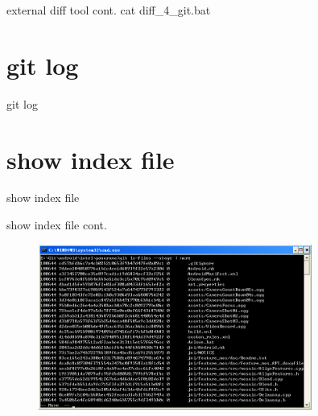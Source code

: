 ﻿\documentclass{beamer}
\begin{document}
\begin{frame}{external diff tool cont.}
  \textcolor{blue!50}{\ttfamily cat diff\_4\_git.bat}
  
\end{frame}


\section[git log]{git log}
\begin{frame}{git log}
\end{frame}


\section[show index file]{show index file}
\begin{frame}{show index file}
\end{frame}

\begin{frame}{show index file cont.}
\begin{figure}
  \centering
  \includegraphics[width=0.8\textwidth]{showindex.png}%
\end{figure}
\end{frame}
\end{document}
